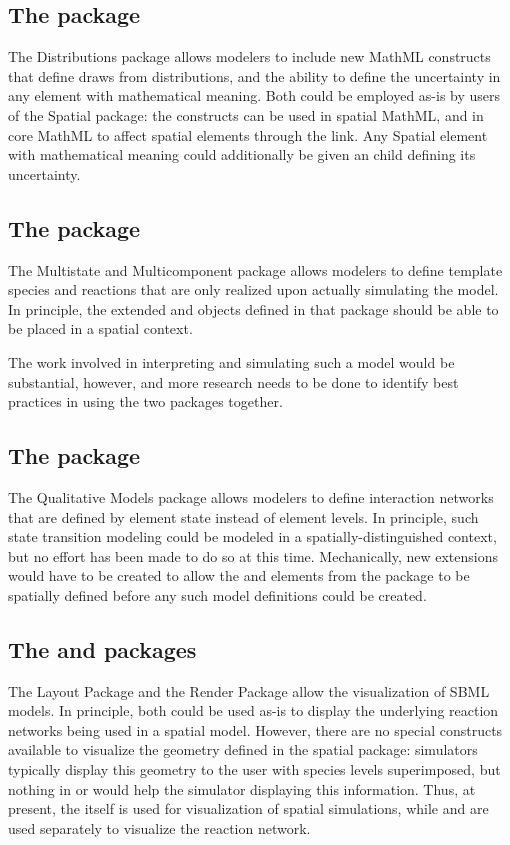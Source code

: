 \begin{blockChanged}
\subsection{The  package}
The Distributions package allows modelers to include new MathML  constructs that define draws from distributions, and the ability to define the uncertainty in any element with mathematical meaning.  Both could be employed as-is by users of the Spatial package:  the  constructs can be used in spatial MathML, and in core MathML to affect spatial elements through the \SpatialSymbolReference link.  Any Spatial element with mathematical meaning could additionally be given an  child defining its uncertainty.


\subsection{The  package}
The Multistate and Multicomponent package allows modelers to define template species and reactions that are only realized upon actually simulating the model.  In principle, the extended \Species and \Reaction objects defined in that package should be able to be placed in a spatial context.

The work involved in interpreting and simulating such a model would be substantial, however, and more research needs to be done to identify best practices in using the two packages together.


\subsection{The  package}
The Qualitative Models  package allows modelers to define interaction networks that are defined by element state instead of element levels.  In principle, such state transition modeling could be modeled in a spatially-distinguished context, but no effort has been made to do so at this time.  Mechanically, new extensions would have to be created to allow the  and  elements from the  package to be spatially defined before any such model definitions could be created.


\subsection{The  and  packages}
The Layout Package and the Render Package allow the visualization of SBML models.  In principle, both could be used as-is to display the underlying reaction networks being used in a spatial model.  However, there are no special constructs available to visualize the geometry defined in the spatial package: simulators typically display this geometry to the user with species levels superimposed, but nothing in  or  would help the simulator displaying this information.  Thus, at present, the \Geometry itself is used for visualization of spatial simulations, while  and  are used separately to visualize the reaction network.
\end{blockChanged}
